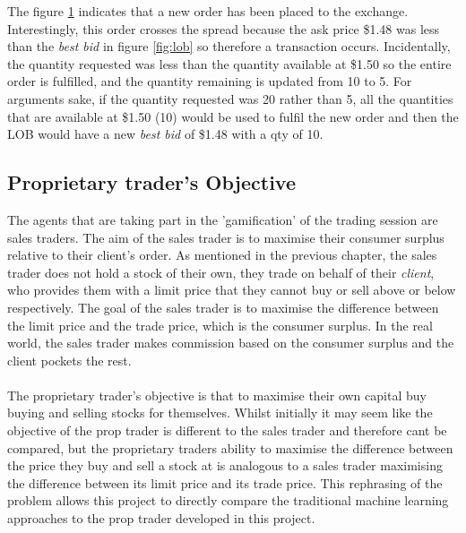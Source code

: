 \documentclass[ %
                    author={Ashwinder Khurana},
                supervisor={Prof Dave Cliff},
                    degree={MEng},
                     title={The Deeply Reinforced Trader},
                  subtitle={},
                      type={enterprise},
                      year={2020} ]{dissertation}
\begin{document}
\begin{figure}[H]
\label{fig:lob-post}  
\end{figure}
\noindent
The figure \ref{fig:lob-post} indicates that a new order has been placed to the exchange. Interestingly, this order crosses the spread because the ask price \$1.48 was less than the \textit{best bid} in figure \ref{fig:lob} so therefore a transaction occurs. Incidentally, the quantity requested was less than the quantity available at \$1.50 so the entire order is fulfilled, and the quantity remaining is updated from 10 to 5. For arguments sake, if the quantity requested was 20 rather than 5, all the quantities that are available at \$1.50 (10) would be used to fulfil the new order and then the LOB would have a new \textit{best bid} of \$1.48 with a qty of 10. 
\vspace{1cm}
\subsection{Proprietary trader's Objective}
\vspace{0.5cm}
The agents that are taking part in the 'gamification' of the trading session are sales traders. The aim of the sales trader is to maximise their consumer surplus relative to their client's order. As mentioned in the previous chapter, the sales trader does not hold a stock of their own, they trade on behalf of their \textit{client}, who provides them with a limit price that they cannot buy or sell above or below respectively. The goal of the sales trader is to maximise the difference between the limit price and the trade price, which is the consumer surplus. In the real world, the sales trader makes commission based on the consumer surplus and the client pockets the rest. 
\\
\\
The proprietary trader's objective is that to maximise their own capital buy buying and selling stocks for themselves. Whilst initially it may seem like the objective of the prop trader is different to the sales trader and therefore cant be compared, but the proprietary traders ability to maximise the difference between the price they buy and sell a stock at is analogous to a sales trader maximising the difference between its limit price and its trade price. This rephrasing of the problem allows this project to directly compare the traditional machine learning approaches to the prop trader developed in this project.
\end{document}

